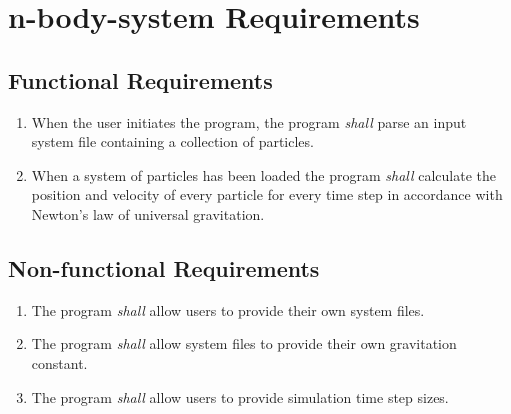 \documentclass[12pt]{article}
\begin{document}
\section*{n-body-system Requirements}
	\subsection*{Functional Requirements}
		\begin{enumerate}[label=FR-\arabic*]
			\item \label{FR.Initiate} When the user initiates the program, the program {\em shall} parse an input system file containing a collection of particles.
			\item \label{FR.Calculate} When a system of particles has been loaded the program {\em shall} calculate the position and velocity of every particle for every time step in accordance with Newton's law of universal gravitation.
		\end{enumerate}
	\subsection*{Non-functional Requirements}
		\begin{enumerate}[label=NR-\arabic*]
			\item \label{NF.UsersProvideFile} The program {\em shall} allow users to provide their own system files. 
			\item \label{NF.SystemsProvideG} The program {\em shall} allow system files to provide their own gravitation constant. 
			\item The program \label{NF.UsersProvideTime} {\em shall} allow users to provide simulation time step sizes. 
		\end{enumerate}
\end{document}

